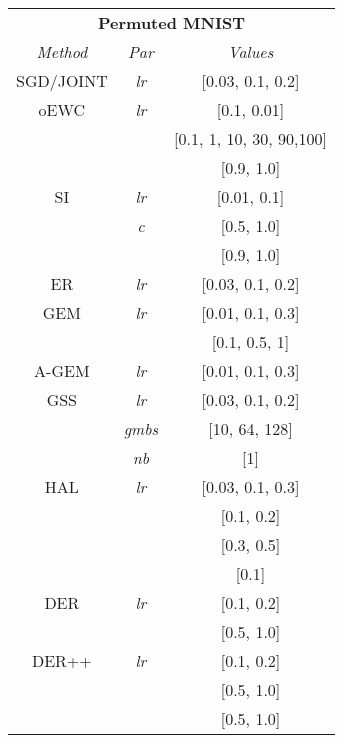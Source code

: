 \documentclass{article}
\begin{document}
{
\begin{table}[H]
    \begin{multicols}{3}
        \setlength{\tabcolsep}{2.5pt}
        \scriptsize
        \begin{tabular}{ccc}
\toprule
\multicolumn{3}{c}{\textbf{Permuted MNIST}}\\
\textit{Method} &  \textit{Par} &
\textit{Values} \\
\midrule
SGD/JOINT  & \textit{lr} & [0.03, 0.1, 0.2] \\
\midrule
oEWC & \textit{lr} & [0.1, 0.01] \\
& 	 \textit{} & [0.1, 1, 10, 30, 90,100] \\
& 	 \textit{} & [0.9, 1.0] \\
\midrule
SI  & \textit{lr} & [0.01, 0.1] \\
& 	 \textit{c} & [0.5, 1.0] \\
& 	 \textit{} & [0.9, 1.0] \\
\midrule
ER & \textit{lr} & [0.03, 0.1, 0.2] \\
\midrule
GEM & \textit{lr} & [0.01, 0.1, 0.3] \\
& \textit{} & [0.1, 0.5, 1]\\
\midrule
A-GEM  & \textit{lr} & [0.01, 0.1, 0.3] \\
\midrule
GSS  & \textit{lr} & [0.03, 0.1, 0.2] \\
& 	 \textit{gmbs} & [10, 64, 128] \\
& 	 \textit{nb} & [1] \\
\midrule
HAL  & \textit{lr} & [0.03, 0.1, 0.3] \\
& 	 \textit{} & [0.1, 0.2] \\
& 	 \textit{} & [0.3, 0.5] \\
& 	 \textit{} & [0.1] \\
\midrule
DER  & \textit{lr} & [0.1, 0.2] \\
& 	 \textit{} & [0.5, 1.0] \\
\midrule
DER++  & \textit{lr} & [0.1, 0.2] \\
& 	 \textit{} & [0.5, 1.0] \\
& 	 \textit{} & [0.5, 1.0] \\
\bottomrule
\end{tabular}


\end{multicols}
\end{table}}
\end{document}
